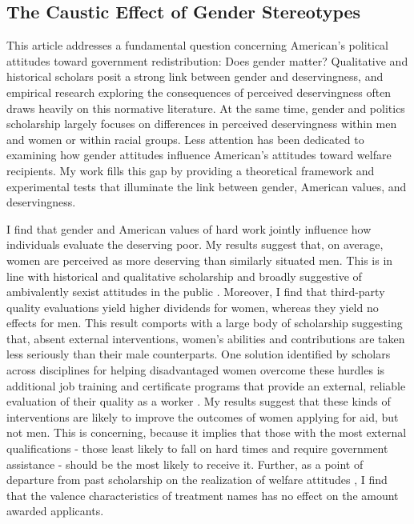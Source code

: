 \documentclass[12pt]{article}%
\begin{document}
\begin{doublespace}
\section*{The Caustic Effect of Gender Stereotypes}
This article addresses a fundamental question concerning American's political attitudes toward government redistribution: Does gender matter? Qualitative and historical scholars posit a strong link between gender and deservingness, and empirical research exploring the consequences of perceived deservingness often draws heavily on this normative literature. At the same time, gender and politics scholarship largely focuses on differences in perceived deservingness within men and women or within racial groups. Less attention has been dedicated to examining how gender attitudes influence American's attitudes toward welfare recipients. My work fills this gap by providing a theoretical framework and experimental tests that illuminate the link between gender, American values, and deservingness.

I find that gender and American values of hard work jointly influence how individuals evaluate the deserving poor. My results suggest that, on average, women are perceived as more deserving than similarly situated men. This is in line with historical and qualitative scholarship \cite{willrich2000home} and broadly suggestive of ambivalently sexist attitudes in the public \citep{glick_ambivalent_2001, glick_hostile_1997}. Moreover, I find that third-party quality evaluations yield higher dividends for women, whereas they yield no effects for men. This result comports with a large body of scholarship suggesting that, absent external interventions, women's abilities and contributions are taken less seriously than their male counterparts. One solution identified by scholars across disciplines for helping disadvantaged women overcome these hurdles is additional job training and certificate programs that provide an external, reliable evaluation of their quality as a worker \citep{abel_value_2020, dadgar_labor_2015, jepsen_labor-market_2014}. My results suggest that these kinds of interventions are likely to improve the outcomes of women applying for aid, but not men. This is concerning, because it implies that those with the most external qualifications - those least likely to fall on hard times and require government assistance - should be the most likely to receive it. Further, as a point of departure from past scholarship on the realization of welfare attitudes \citep{hayes_2020}, I find that the valence characteristics of treatment names has no effect on the amount awarded applicants.


\end{doublespace}
\end{document}
